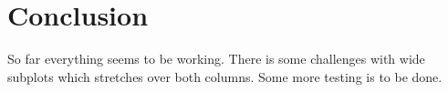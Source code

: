 \section{Conclusion}
So far everything seems to be working. There is some challenges with wide subplots which stretches over both columns. Some more testing is to be done.
